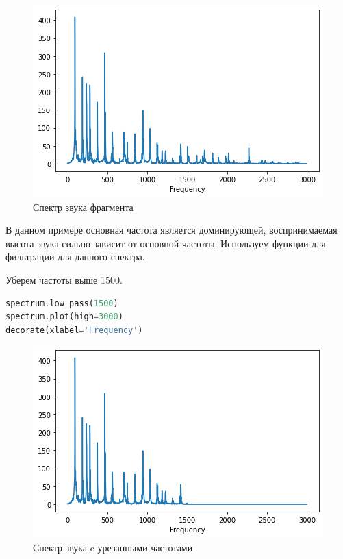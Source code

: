 \begin{figure}[H]
	\begin{center}
		\includegraphics[scale=1]{fig/lab01/lab01_2.png}
		\caption{Спектр звука фрагмента}
	\end{center}
\end{figure}

В данном примере основная частота является доминирующей, воспринимаемая высота звука сильно зависит от основной частоты. Используем функции для фильтрации для данного спектра.


Уберем частоты выше 1500.

\begin{lstlisting}[language=Python]
spectrum.low_pass(1500)
spectrum.plot(high=3000)
decorate(xlabel='Frequency')
\end{lstlisting}

\begin{figure}[H]
	\begin{center}
		\includegraphics[scale=1]{fig/lab01/lab01_3.png}
		\caption{Спектр звука c урезанными частотами}
	\end{center}
\end{figure}

